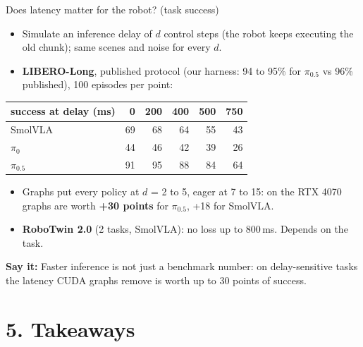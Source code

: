 \documentclass[aspectratio=169,10pt]{beamer}
\newcommand{\say}[1]{\par\vfill\noindent\colorbox{soft}{\parbox{\dimexpr\textwidth-2\fboxsep\relax}{\small\textbf{\textcolor{accent}{Say it:}} #1}}}
\begin{document}
\begin{frame}{Does latency matter for the robot? (task success)}
\begin{itemize}
\item Simulate an inference delay of $d$ control steps (the robot keeps executing the old
  chunk); same scenes and noise for every $d$.
\item \textbf{LIBERO-Long}, published protocol (our harness: 94 to 95\% for $\pi_{0.5}$ vs 96\%
  published), 100 episodes per point:
\end{itemize}
\centering\small
\begin{tabular}{lrrrrr}\toprule
success at delay (ms) & 0 & 200 & 400 & 500 & 750\\\midrule
SmolVLA & 69 & 68 & 64 & 55 & 43\\
$\pi_0$ & 44 & 46 & 42 & 39 & 26\\
$\pi_{0.5}$ & 91 & 95 & 88 & 84 & 64\\\bottomrule
\end{tabular}
\begin{itemize}
\item Graphs put every policy at $d$ = 2 to 5, eager at 7 to 15: on the RTX 4070 graphs are
  worth \textbf{+30 points} for $\pi_{0.5}$, +18 for SmolVLA.
\item \textbf{RoboTwin 2.0} (2 tasks, SmolVLA): no loss up to 800\,ms. Depends on the task.
\end{itemize}
\say{Faster inference is not just a benchmark number: on delay-sensitive tasks the latency
CUDA graphs remove is worth up to 30 points of success.}
\end{frame}

\section{5. Takeaways}
\end{document}
